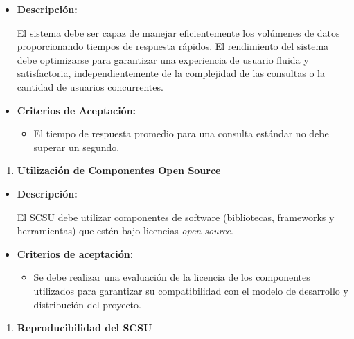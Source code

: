 \documentclass[
  12pt,
  openany]{book}
\providecommand{\tightlist}{%
  \setlength{\itemsep}{0pt}\setlength{\parskip}{0pt}}
\begin{document}
\begin{itemize}
\item
  \textbf{Descripción:}

  El sistema debe ser capaz de manejar eficientemente los volúmenes de datos proporcionando tiempos de respuesta rápidos. El rendimiento del sistema debe optimizarse para garantizar una experiencia de usuario fluida y satisfactoria, independientemente de la complejidad de las consultas o la cantidad de usuarios concurrentes.
\item
  \textbf{Criterios de Aceptación:}

  \begin{itemize}
  \tightlist
  \item
    El tiempo de respuesta promedio para una consulta estándar no debe superar un segundo.
  \end{itemize}
\end{itemize}

\begin{enumerate}
\def\labelenumi{\arabic{enumi}.}
\setcounter{enumi}{1}
\tightlist
\item
  \textbf{Utilización de Componentes Open Source}
\end{enumerate}

\begin{itemize}
\item
  \textbf{Descripción:}

  El SCSU debe utilizar componentes de software (bibliotecas, frameworks y herramientas) que estén bajo licencias \emph{open source}.
\item
  \textbf{Criterios de aceptación:}

  \begin{itemize}
  \tightlist
  \item
    Se debe realizar una evaluación de la licencia de los componentes utilizados para garantizar su compatibilidad con el modelo de desarrollo y distribución del proyecto.
  \end{itemize}
\end{itemize}

\begin{enumerate}
\def\labelenumi{\arabic{enumi}.}
\setcounter{enumi}{2}
\tightlist
\item
  \textbf{Reproducibilidad del SCSU}
\end{enumerate}
\end{document}
